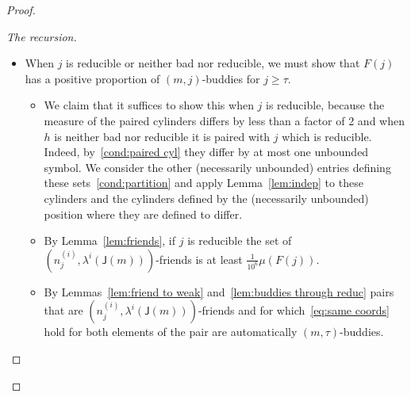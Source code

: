 \documentclass[AHL,Unicode,longabstracts,published]{cedram}
\DeclareMathOperator{\bad}{\mathsf{V}}
\DeclareMathOperator{\p}{\mathsf{p}}
\newcommand{\lft}{\mathsf{L}}
\newcommand{\rht}{\mathsf{R}}
\newcommand{\scl}{\mathsf{J}}
\let\originalleft\left
\let\originalright\right
\renewcommand{\left}{\mathopen{}\mathclose\bgroup\originalleft}
\renewcommand{\right}{\aftergroup\egroup\originalright}
\begin{document}
\begin{proof}
\begin{proof}[{The recursion}]
\begin{itemize}
With~\eqref{eqn:bad pair sets comparable} established it suffices to find a positive proportion of $(m,\tau)$ buddies in either $A^{(i)}_j$ or $A^{(i)}_k$. How this is done depends on why the pair $h,j$ is bad.
\begin{itemize}
\item If $\scl(n^{(i)}_j) = \lambda^i(\scl(m))$ and $s \in \{
\lft(n^{(i)}_j), \rht(n^{(i)}_j) \}$ at a bounded scale not smaller than $\tau$ apply Theorem~\ref{thm:bounded wfriends} with $s$ in place of $r$ and note that the set $B$ therein is defined by coordinates no larger than $\scl(s) + 1$ while $A^{(i)}_j$ is defined by coordinates no smaller than $\lambda^{i-1}(\scl(m))$. We may therefore apply Lemma~\ref{lem:indep} to get
\[
\mu\left(B \cap A^{(i)}_j\right) \ge \left(1 - \frac{1}{2^{2^5}} \right) \mu(B) \mu\left(A^{(i)}_j\right)
\]
whence a positive proportion of $A^{(i)}_j$ intersects $B$. Removing $\bad(\scl(s),8s)$ and~\eqref{eqn:bad ancestors} leaves us with a positive proportion of $(m,\tau)$ buddies, as in the proof of Corollary~\ref{cor:bounded mmix}.
\item If $\scl(n^{(i)}_j) = \lambda^i(\scl(m))$ and $n^{(i)}_j <
\frac{3}{4} \p(\lambda^i(\scl(m)))$ apply Proposition~\ref{prop:small friend}.
\item If instead $\scl(n^{(i)}_h) = \lambda^i(\scl(m))$ the arguments are exactly the same upon replacing $j$ with $h$.
\end{itemize}
\item When $j$ is reducible or neither bad nor reducible, we must show that $F(j)$ has a positive proportion of $(m,j)$-buddies for $j\geq \tau$.
\begin{itemize}
\item We claim that it suffices to show this when $j$ is reducible, because the measure of the paired cylinders differs by less than a factor of 2 and when $h$ is neither bad nor reducible it is paired with $j$ which is reducible. Indeed, by~\eqref{cond:paired cyl} they differ by at most one unbounded symbol. We consider the other (necessarily unbounded) entries defining these sets~\eqref{cond:partition} and apply Lemma~\ref{lem:indep} to these cylinders and the cylinders defined by the (necessarily unbounded) position where they are defined to differ.
\item By Lemma~\ref{lem:friends}, if $j$ is reducible the set of $(n_j^{(i)},\lambda^{i}(\scl(m)))$-friends is at least $\frac{1}{10^6}\mu(F(j))$.
\item By Lemmas~\ref{lem:friend to weak} and~\ref{lem:buddies through reduc} pairs that are $(n_j^{(i)},\lambda^{i}(\scl(m)))$-friends and for which~\eqref{eq:same coords} hold for both elements of the pair are automatically $(m,\tau)$-buddies.
\end{itemize}
\end{itemize}


\end{proof}
\end{proof}
\end{document}
